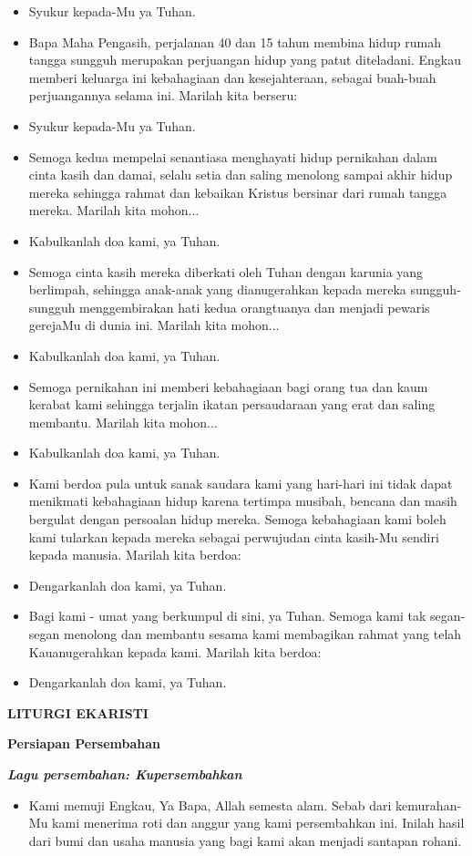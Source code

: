 \documentclass[10pt]{book}
\makeatletter
\newcommand{\judul}[1]{%
  {\parindent \z@ \centering \normalfont
    \interlinepenalty\@M \Large \bfseries #1\par\nobreak \vskip 20\p@ }}
\newcommand{\subjudul}[1]{%
  {\parindent \z@ \normalfont
    \interlinepenalty\@M \bfseries #1\par\nobreak \vskip 20\p@ }}
\newcommand{\lagu}[1]{%
  {\parindent \z@ \normalfont
    \interlinepenalty\@M \bfseries \emph{#1}\par\nobreak \vskip 20\p@ }}
\newcommand{\BU}[1]{\begin{itemize} \item[U:] #1 \end{itemize}}
\newcommand{\BI}[1]{\begin{itemize} \item[I:] #1 \end{itemize}}
\newcommand{\BP}[1]{\begin{itemize} \item[P:] #1 \end{itemize}}
\newcommand{\BMP}[1]{\begin{itemize} \item[W+N:] #1 \end{itemize}}
\newcommand{\ultah}{40 }
\newcommand{\ultahdua}{15 }
\makeatother
\begin{document}
\BU{Syukur kepada-Mu ya Tuhan.}

\BP{Bapa Maha Pengasih, perjalanan \ultah dan \ultahdua tahun membina hidup rumah tangga sungguh merupakan perjuangan hidup yang patut diteladani. Engkau memberi keluarga ini kebahagiaan dan kesejahteraan, sebagai buah-buah perjuangannya selama ini. Marilah kita berseru:}

\BU{Syukur kepada-Mu ya Tuhan.}

\BP{Semoga kedua mempelai senantiasa menghayati hidup pernikahan dalam cinta kasih dan damai, selalu setia dan saling menolong sampai akhir hidup mereka sehingga rahmat dan kebaikan Kristus bersinar dari rumah tangga mereka. 
Marilah kita mohon...}

\BU{Kabulkanlah doa kami, ya Tuhan.}

\BP{Semoga cinta kasih mereka diberkati oleh Tuhan dengan karunia yang berlimpah, sehingga anak-anak yang dianugerahkan kepada mereka sungguh-sungguh menggembirakan hati kedua orangtuanya dan menjadi pewaris gerejaMu di dunia ini.
Marilah kita mohon...}

\BU{Kabulkanlah doa kami, ya Tuhan.}

\BMP{Semoga pernikahan ini memberi kebahagiaan bagi orang tua dan kaum kerabat kami sehingga terjalin ikatan persaudaraan yang erat dan saling membantu.
Marilah kita mohon...}

\BU{Kabulkanlah doa kami, ya Tuhan.}

\BP{Kami berdoa pula untuk sanak saudara kami yang hari-hari ini tidak dapat menikmati kebahagiaan hidup karena tertimpa musibah, bencana dan masih bergulat dengan persoalan hidup mereka. Semoga kebahagiaan kami boleh kami tularkan kepada mereka sebagai perwujudan cinta kasih-Mu sendiri kepada manusia. Marilah kita berdoa:}

\BU{Dengarkanlah doa kami, ya Tuhan.}

\BP{Bagi kami - umat yang berkumpul di sini, ya Tuhan. Semoga kami tak segan-segan menolong dan membantu sesama kami membagikan rahmat yang telah Kauanugerahkan kepada kami. Marilah kita berdoa:}

\BU{Dengarkanlah doa kami, ya Tuhan.}

\judul{LITURGI EKARISTI}

\subjudul{Persiapan Persembahan}

\lagu{Lagu persembahan: Kupersembahkan}

\BI{Kami memuji Engkau, Ya Bapa, Allah semesta alam. Sebab dari kemurahan-Mu kami menerima roti dan anggur yang kami persembahkan ini. Inilah hasil dari bumi dan usaha manusia yang bagi kami akan menjadi santapan rohani.}
\end{document}
